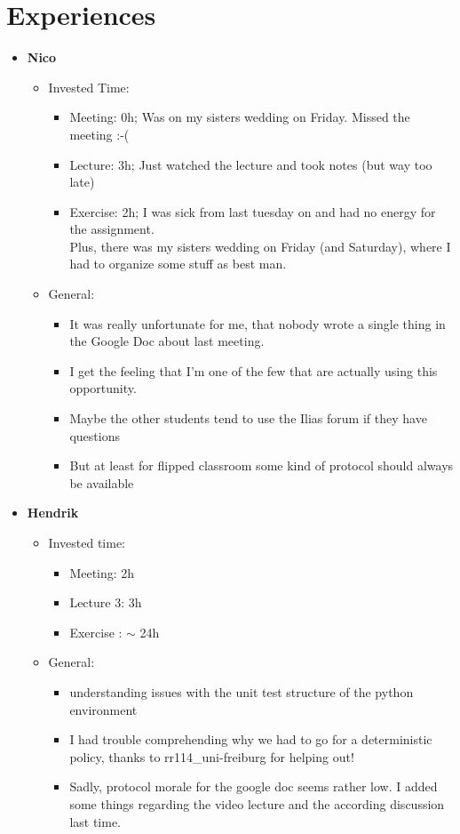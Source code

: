 \documentclass[paper=a4, fontsize=10pt]{scrartcl} %
\numberwithin{equation}{section} %
\numberwithin{figure}{section} %
\numberwithin{table}{section} %
\begin{document}
\section{Experiences}
\begin{itemize}
	\item \textbf{Nico}
	\begin{itemize}
		\item Invested Time:
		\begin{itemize}
			\item Meeting: 0h; Was on my sisters wedding on Friday. Missed the meeting :-(
			\item Lecture: 3h; Just watched the lecture and took notes (but way too late)
			\item Exercise: 2h; I was sick from last tuesday on and had no energy for the assignment.\\
		Plus, there was my sisters wedding on Friday (and Saturday), where I had to organize some stuff as best man.
		\end{itemize}		
		\item General:
		\begin{itemize}
			\item It was really unfortunate for me, that nobody wrote a single thing in the Google Doc about last meeting.
			\item I get the feeling that I'm one of the few that are actually using this opportunity.
			\item Maybe the other students tend to use the Ilias forum if they have questions
			\item But at least for flipped classroom some kind of protocol should always be available
		\end{itemize}
	\end{itemize}

	\item \textbf{Hendrik}
	\begin{itemize}
		\item Invested time:
		\begin{itemize}
			\item Meeting: 2h
			\item Lecture 3: 3h
			\item Exercise : $\sim$ 24h
		\end{itemize}
		\item General:
		\begin{itemize}
			\item understanding issues with the unit test structure of the python environment
			\item I had trouble comprehending why we had to go for a deterministic policy, thanks to rr114\_uni-freiburg  for helping out!
			\item Sadly, protocol morale for the google doc seems rather low. I added some things regarding the video lecture and the according discussion last time.		
		\end{itemize}
	\end{itemize}
\end{itemize}
	
\end{document}
